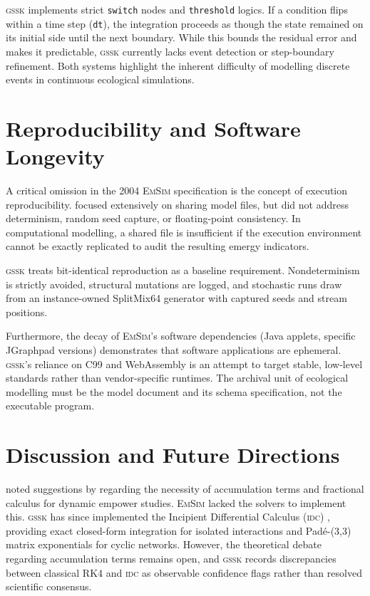 \documentclass[3p,times,authoryear]{elsarticle}
\newcommand{\gssk}{\textsc{gssk}}
\newcommand{\idc}{\textsc{idc}}
\newcommand{\emsim}{\textsc{EmSim}}
\newcommand{\code}[1]{\texttt{\small #1}}
\begin{document}
\gssk{} implements strict \code{switch} nodes and \code{threshold} logics. If a condition flips within a time step (\code{dt}), the integration proceeds as though the state remained on its initial side until the next boundary. While this bounds the residual error and makes it predictable, \gssk{} currently lacks event detection or step-boundary refinement. Both systems highlight the inherent difficulty of modelling discrete events in continuous ecological simulations.

\section{Reproducibility and Software Longevity}
\label{sec:reproducibility}

A critical omission in the 2004 \emsim{} specification is the concept of execution reproducibility. \citet{valyi2004} focused extensively on sharing model files, but did not address determinism, random seed capture, or floating-point consistency. In computational modelling, a shared file is insufficient if the execution environment cannot be exactly replicated to audit the resulting emergy indicators.

\gssk{} treats bit-identical reproduction as a baseline requirement. Nondeterminism is strictly avoided, structural mutations are logged, and stochastic runs draw from an instance-owned SplitMix64 generator with captured seeds and stream positions. 

Furthermore, the decay of \emsim's software dependencies (Java applets, specific JGraphpad versions) demonstrates that software applications are ephemeral. \gssk's reliance on C99 and WebAssembly is an attempt to target stable, low-level standards rather than vendor-specific runtimes. The archival unit of ecological modelling must be the model document and its schema specification, not the executable program.

\section{Discussion and Future Directions}
\label{sec:discussion}

\citet{valyi2004} noted suggestions by \citet{giannantoni2002} regarding the necessity of accumulation terms and fractional calculus for dynamic empower studies. \emsim{} lacked the solvers to implement this. \gssk{} has since implemented the Incipient Differential Calculus (\idc) \citep{giannantoni2006}, providing exact closed-form integration for isolated interactions and Padé-(3,3) matrix exponentials for cyclic networks. However, the theoretical debate regarding accumulation terms remains open, and \gssk{} records discrepancies between classical RK4 and \idc{} as observable confidence flags rather than resolved scientific consensus.
\end{document}
